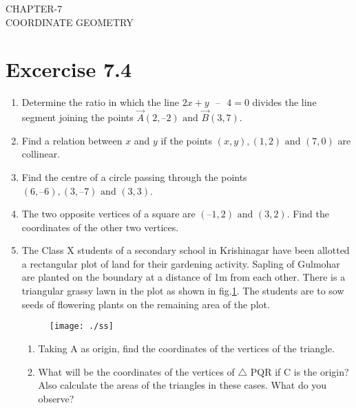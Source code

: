 \documentclass[12pt]{article}
\begin{document}
\begin{center}
\textbf\large{CHAPTER-7 \\ COORDINATE GEOMETRY}

\end{center}
\section*{Excercise 7.4}

\begin{enumerate}
\item Determine the ratio in which the line $2x+y \text{ } –\text{ } 4=0$ divides the line segment joining the points $\vec{A}(2, – 2) \text{ and } \vec{B}(3, 7)$.

\item Find a relation between $x$ and $y$ if the points $(x, y), (1, 2) \text{ and } (7, 0)$ are collinear.

\item Find the centre of a circle passing through the points $(6, – 6), (3, – 7) \text{ and } (3, 3)$.

\item The two opposite vertices of a square are $(–1, 2) \text{ and } (3, 2)$. Find the coordinates of the other two vertices.

\item The Class X students of a secondary school in Krishinagar have been allotted a rectangular plot of land for their gardening activity. Sapling of Gulmohar are planted on the boundary at a distance of 1m from each other. There is a triangular grassy lawn in the plot as shown in fig.\ref{fig:Fig1}. The students are to sow seeds of flowering plants on the remaining area of the plot.\\

\begin{figure}[!h]
	\begin{center} 
	    \texttt{[image: ./ss]}
	\end{center}
\caption{}
\label{fig:Fig1}
\end{figure}

\begin{enumerate}
\item Taking A as origin, find the coordinates of the vertices of the triangle.\\
\item What will be the coordinates of the vertices of $\triangle$ PQR if C is the origin?\\
Also calculate the areas of the triangles in these cases. What do you observe?
\end{enumerate}



\end{enumerate}
\end{document}
